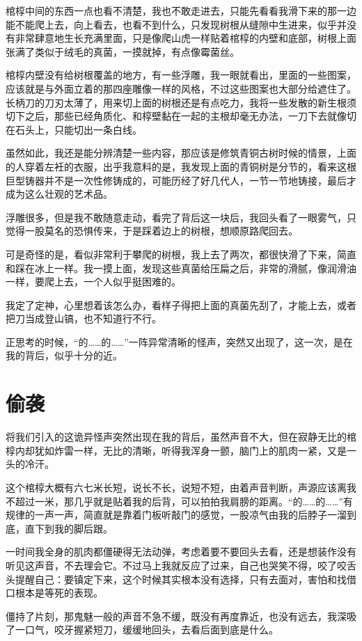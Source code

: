 棺椁中间的东西一点也看不清楚，我也不敢走进去，只能先看看我滑下来的那一边能不能爬上去，向上看去，也看不到什么，只发现树根从缝隙中生进来，似乎并没有非常肆意地生长充满里面，只是像爬山虎一样贴着棺椁的内壁和底部，树根上面张满了类似于绒毛的真菌，一摸就掉，有点像霉菌丝。

棺椁内壁没有给树根覆盖的地方，有一些浮雕，我一眼就看出，里面的一些图案，应该就是与外面立着的那四座雕像一样的风格，不过这些图案也大部分给遮住了。长柄刀的刀刃太薄了，用来切上面的树根还是有点吃力，我将一些发散的新生根须切下之后，那些已经角质化、和椁壁黏在一起的主根却毫无办法，一刀下去就像切在石头上，只能切出一条白线。

虽然如此，我还是能分辨清楚一些内容，那应该是修筑青铜古树时候的情景，上面的人穿着左衽的衣服，出乎我意料的是，我发现上面的青铜树是分节的，看来这根巨型铸器并不是一次性修铸成的，可能历经了好几代人，一节一节地铸接，最后才成为这么壮观的艺术品。

浮雕很多，但是我不敢随意走动，看完了背后这一块后，我回头看了一眼雾气，只觉得一股莫名的恐惧传来，于是踩着边上的树根，想顺原路爬回去。

可是奇怪的是，看似非常利于攀爬的树根，我上去了两次，都很快滑了下来，简直和踩在冰上一样。我一摸上面，发现这些真菌给压扁之后，非常的滑腻，像润滑油一样，要爬上去，一个人似乎挺困难的。

我定了定神，心里想着该怎么办，看样子得把上面的真菌先刮了，才能上去，或者把刀当成登山镐，也不知道行不行。

正思考的时候，“的……的……”一阵异常清晰的怪声，突然又出现了，这一次，是在我的背后，似乎十分的近。

\chapter{偷袭}

将我们引入的这诡异怪声突然出现在我的背后，虽然声音不大，但在寂静无比的棺椁内却犹如炸雷一样，无比的清晰，听得我浑身一颤，脑门上的肌肉一紧，又是一头的冷汗。

这个棺椁大概有六七米长短，说长不长，说短不短，由着声音判断，声源应该离我不超过一米，那几乎就是贴着我的后背，可以拍拍我肩膀的距离。“的……的……”有规律的一声一声，简直就是靠着门板听敲门的感觉，一股凉气由我的后脖子一溜到底，直下到我的脚后跟。

一时间我全身的肌肉都僵硬得无法动弹，考虑着要不要回头去看，还是想装作没有听见这声音，不去理会它。不过马上我就反应了过来，自己也哭笑不得，咬了咬舌头提醒自己：要镇定下来，这个时候其实根本没有选择，只有去面对，害怕和找借口根本是等死的表现。

僵持了片刻，那鬼魅一般的声音不急不缓，既没有再度靠近，也没有远去，我深吸了一口气，咬牙握紧短刀，缓缓地回头，去看后面到底是什么。

